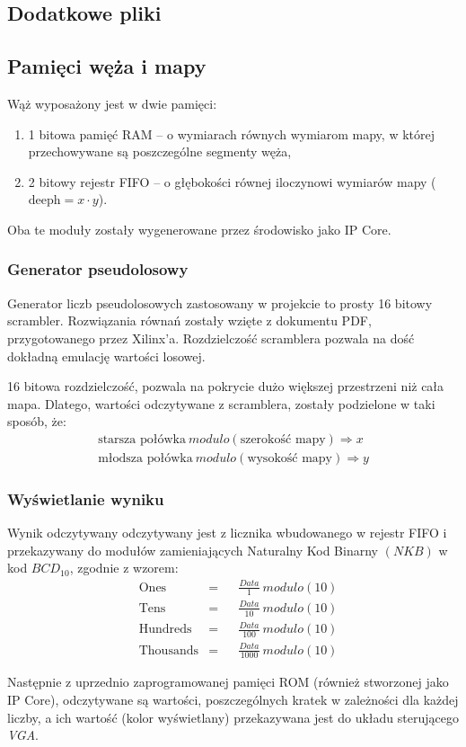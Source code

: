\subsection{Dodatkowe pliki}
    \subsection{Pamięci węża i mapy}
        \tab Wąż wyposażony jest w dwie pamięci:
        \begin{enumerate}
            \item 1 bitowa pamięć RAM -- o wymiarach równych wymiarom mapy, w której przechowywane są poszczególne segmenty węża,
            \item 2 bitowy rejestr FIFO -- o głębokości równej iloczynowi wymiarów mapy ($\text{deeph} = x\cdot y$).
        \end{enumerate}
        Oba te moduły zostały wygenerowane przez środowisko jako IP Core.
    \subsubsection{Generator pseudolosowy}
        \tab Generator liczb pseudolosowych zastosowany w projekcie to prosty 16 bitowy scrambler.
        Rozwiązania równań zostały wzięte z dokumentu PDF, przygotowanego przez Xilinx'a.
        Rozdzielczość scramblera pozwala na dość dokładną emulację wartości losowej.

        16 bitowa rozdzielczość, pozwala na pokrycie dużo większej przestrzeni niż cała mapa.
        Dlatego, wartości odczytywane z scramblera, zostały podzielone w taki sposób, że:
        \begin{align}
            \text{starsza połówka}\ modulo(\text{szerokość mapy}) \Rightarrow x \\
            \text{młodsza połówka}\ modulo(\text{wysokość mapy}) \Rightarrow y 
        \end{align}
    \newpage
    \subsubsection{Wyświetlanie wyniku}
        \tab Wynik odczytywany odczytywany jest z licznika wbudowanego w rejestr FIFO
        i przekazywany do modułów zamieniających Naturalny Kod Binarny $(NKB)$ w kod $BCD_{10}$, zgodnie z wzorem:
        \begin{align}
            &\text{Ones} &=& &\frac{Data}{1}\ modulo(10) \\
            &\text{Tens} &=& &\frac{Data}{10}\ modulo(10) \\
            &\text{Hundreds} &=& &\frac{Data}{100}\ modulo(10) \\
            &\text{Thousands} &=& &\frac{Data}{1000}\ modulo(10)
        \end{align}

        Następnie z uprzednio zaprogramowanej pamięci ROM (również stworzonej jako IP Core),
        odczytywane są wartości, poszczególnych kratek w zależności dla każdej liczby, a ich wartość (kolor wyświetlany) przekazywana jest do układu sterującego \textit{VGA}.
